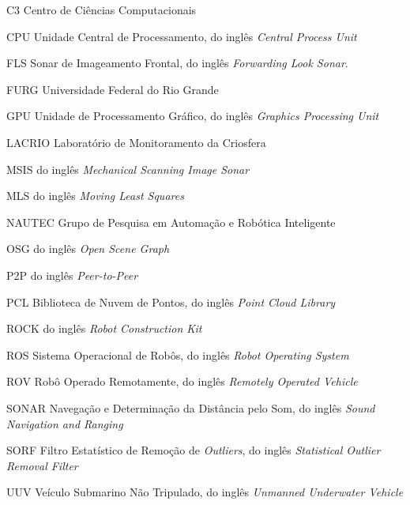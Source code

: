 
\begin{siglas}
    \item[C3] Centro de Ciências Computacionais
    \item[CPU] Unidade Central de Processamento, do inglês \textit{Central Process Unit}
    \item[FLS] Sonar de Imageamento Frontal, do inglês \textit{Forwarding Look Sonar}.
    \item[FURG] Universidade Federal do Rio Grande
    \item[GPU] Unidade de Processamento Gráfico, do inglês \textit{Graphics Processing Unit}
    \item[LACRIO] Laboratório de Monitoramento da Criosfera
    \item[MSIS] do inglês \textit{Mechanical Scanning Image Sonar}
    \item[MLS] do inglês \textit{Moving Least Squares}
    \item[NAUTEC] Grupo de Pesquisa em Automação e Robótica Inteligente
    \item[OSG] do inglês \textit{Open Scene Graph}
    \item[P2P] do inglês \textit{Peer-to-Peer}
    \item[PCL] Biblioteca de Nuvem de Pontos, do inglês \textit{Point Cloud Library}
    \item[ROCK] do inglês \textit{Robot Construction Kit}
    \item[ROS] Sistema Operacional de Robôs, do inglês \textit{Robot Operating System}
    \item[ROV] Robô Operado Remotamente, do inglês \textit{Remotely Operated Vehicle}
    \item[SONAR] Navegação e Determinação da Distância pelo Som, do inglês \textit{Sound Navigation and Ranging}
    \item[SORF] Filtro Estatístico de Remoção de \textit{Outliers}, do inglês \textit{Statistical Outlier Removal Filter}
    \item[UUV] Veículo Submarino Não Tripulado, do inglês \textit{Unmanned Underwater Vehicle}
\end{siglas}



